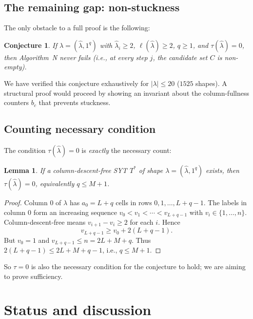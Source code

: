 \documentclass[11pt]{article}
\newtheorem{lemma}[theorem]{Lemma}
\newtheorem{conjecture}[theorem]{Conjecture}
\theoremstyle{definition}
\newcommand{\hatl}{\widehat\lambda}
\begin{document}
\subsection{The remaining gap: non-stuckness}

The only obstacle to a full proof is the following:

\begin{conjecture}\label{conj:not-stuck}
If $\lambda = (\hatl, 1^q)$ with $\hatl_i \ge 2$, $\ell(\hatl) \ge 2$,
$q \ge 1$, and $\tau(\hatl) = 0$, then Algorithm~N never fails (i.e.,
at every step $j$, the candidate set $C$ is non-empty).
\end{conjecture}

We have verified this conjecture exhaustively for $|\lambda| \le 20$
($1525$ shapes).  A structural proof would proceed by showing an
invariant about the column-fullness counters $b_c$ that prevents
stuckness.

\subsection{Counting necessary condition}\label{sec:counting}

The condition $\tau(\hatl) = 0$ is \emph{exactly} the necessary count:

\begin{lemma}\label{lem:tau0-necessary}
If a column-descent-free SYT $T^*$ of shape $\lambda = (\hatl, 1^q)$
exists, then $\tau(\hatl) = 0$, equivalently $q \le M + 1$.
\end{lemma}

\begin{proof}
Column $0$ of $\lambda$ has $a_0 = L + q$ cells in rows
$0, 1, \ldots, L+q-1$.  The labels in column $0$ form an increasing
sequence $v_0 < v_1 < \cdots < v_{L+q-1}$ with $v_i \in \{1, \ldots,
n\}$.  Column-descent-free means $v_{i+1} - v_i \ge 2$ for each $i$.
Hence
\[
  v_{L+q-1} \ge v_0 + 2(L+q-1).
\]
But $v_0 = 1$ and $v_{L+q-1} \le n = 2L + M + q$.  Thus
$2(L+q-1) \le 2L + M + q - 1$, i.e., $q \le M + 1$.
\end{proof}

So $\tau = 0$ is also the necessary condition for the conjecture to
hold; we are aiming to prove sufficiency.

\section{Status and discussion}\label{sec:status}
\end{document}
